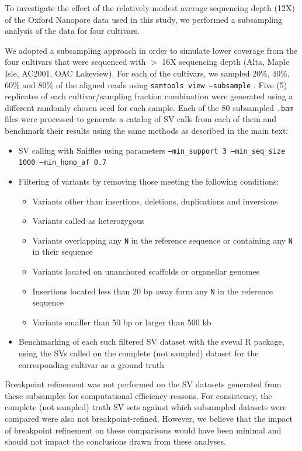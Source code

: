 \documentclass[12pt]{article}
\begin{document}
To investigate the effect of the relatively modest average sequencing depth (12X) of the Oxford Nanopore data used in this study, we performed a subsampling analysis of the data for four cultivars.

We adopted a subsampling approach in order to simulate lower coverage from the four cultivars that were sequenced with $>$ 16X sequencing depth (Alta, Maple Isle, AC2001, OAC Lakeview).
For each of the cultivars, we sampled 20\%, 40\%, 60\% and 80\% of the aligned reads using \texttt{samtools view --subsample} \citep{bcftools}.
Five (5) replicates of each cultivar/sampling fraction combination were generated using a different randomly chosen seed for each sample.
Each of the 80 subsampled \texttt{.bam} files were processed to generate a catalog of SV calls from each of them and benchmark their results using the same methods as described in the main text:

\begin{itemize}
	\item SV calling with Sniffles using parameters \texttt{--min\_support 3 --min\_seq\_size 1000 --min\_homo\_af 0.7}
	\item Filtering of variants by removing those meeting the following conditions:
		\begin{itemize}
			\item Variants other than insertions, deletions, duplications and inversions
			\item Variants called as heterozygous
			\item Variants overlapping any \texttt{N} in the reference sequence or containing any \texttt{N} in their sequence
			\item Variants located on unanchored scaffolds or organellar genomes
			\item Insertions located less than 20 bp away form any \texttt{N} in the reference sequence
			\item Variants smaller than 50 bp or larger than 500 kb
		\end{itemize}
	\item Benchmarking of each such filtered SV dataset with the sveval R package, using the SVs called on the complete (not sampled) dataset for the corresponding cultivar as a ground truth
\end{itemize}

Breakpoint refinement was not performed on the SV datasets generated from these subsamples for computational efficiency reasons.
For consistency, the complete (not sampled) truth SV sets against which subsampled datasets were compared were also not breakpoint-refined.
However, we believe that the impact of breakpoint refinement on these comparisons would have been minimal and should not impact the conclusions drawn from these analyses.
\end{document}
